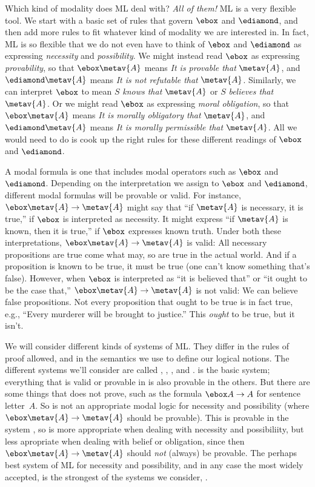 Which kind of modality does ML deal with? \emph{All of them!} ML is a very flexible tool. We start with a basic set of rules that govern $\ebox$ and $\ediamond$, and then add more rules to fit whatever kind of modality we are interested in. In fact, ML is so flexible that we do not even have to think of $\ebox$ and $\ediamond$ as expressing \emph{necessity} and \emph{possibility}. We might instead read $\ebox$ as expressing \emph{provability}, so that $\ebox\metav{A}$ means \emph{It is provable that} $\metav{A}$, and $\ediamond\metav{A}$ means \emph{It is not refutable that} $\metav{A}$. Similarly, we can interpret $\ebox$ to mean $S$ \emph{knows that $\metav{A}$} or $S$ \emph{believes that $\metav{A}$}. Or we might read $\ebox$ as expressing \emph{moral obligation}, so that $\ebox \metav{A}$ means \emph{It is morally obligatory that} $\metav{A}$, and $\ediamond \metav{A}$ means \emph{It is morally permissible that} $\metav{A}$. All we would need to do is cook up the right rules for these different readings of $\ebox$ and $\ediamond$.

A modal formula is one that includes modal operators such as $\ebox$ and $\ediamond$. Depending on the interpretation we assign to $\ebox$ and $\ediamond$, different modal formulas will be provable or valid. For instance, $\ebox \metav{A} \eif \metav{A}$ might say that ``if $\metav{A}$ is necessary, it is true,'' if $\ebox$ is interpreted as necessity. It might express ``if $\metav{A}$ is known, then it is true,'' if $\ebox$ expresses known truth. Under both these interpretations, $\ebox\metav{A} \eif \metav{A}$ is valid: All necessary propositions are true come what may, so are true in the actual world. And if a proposition is known to be true, it must be true (one can't know something that's false). However, when $\ebox$ is interpreted as ``it is believed that'' or ``it ought to be the case that,'' $\ebox\metav{A} \eif \metav{A}$ is not valid: We can believe false propositions. Not every proposition that ought to be true is in fact true, e.g., ``Every murderer will be brought to justice.'' This \emph{ought} to be true, but it isn't. 

We will consider different kinds of systems of ML. They differ in the rules of proof allowed, and in the semantics we use to define our logical notions. The different systems we'll consider are called \mlK, \mlT, \mlSfour, and \mlSfive. \mlK{} is the basic system; everything that is valid or provable in \mlK{} is also provable in the others. But there are some things that \mlK{} does not prove, such as the formula $\ebox A \eif A$ for sentence letter~$A$. So \mlK{} is not an appropriate modal logic for necessity and possibility (where $\ebox\metav{A} \eif \metav{A}$ should be provable). This is provable in the system \mlT, so \mlT{} is more appropriate when dealing with necessity and possibiliity, but less apropriate when dealing with belief or obligation, since then $\ebox\metav{A} \eif \metav{A}$ should \emph{not} (always) be provable. The perhaps best system of ML for necessity and possibility, and in any case the most widely accepted, is the strongest of the systems we consider, \mlSfive.

